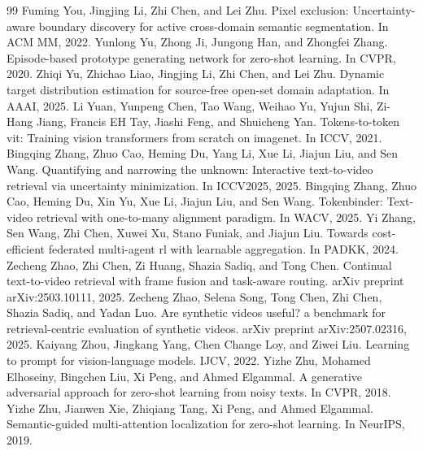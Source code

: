 \begin{thebibliography}{99}
 Fuming You, Jingjing Li, Zhi Chen, and Lei Zhu. Pixel exclusion: Uncertainty-aware boundary discovery for active cross-domain semantic segmentation. In ACM MM, 2022.
 Yunlong Yu, Zhong Ji, Jungong Han, and Zhongfei Zhang. Episode-based prototype generating network for zero-shot learning. In CVPR, 2020.
 Zhiqi Yu, Zhichao Liao, Jingjing Li, Zhi Chen, and Lei Zhu. Dynamic target distribution estimation for source-free open-set domain adaptation. In AAAI, 2025.
 Li Yuan, Yunpeng Chen, Tao Wang, Weihao Yu, Yujun Shi, Zi-Hang Jiang, Francis EH Tay, Jiashi Feng, and Shuicheng Yan. Tokens-to-token vit: Training vision transformers from scratch on imagenet. In ICCV, 2021.
 Bingqing Zhang, Zhuo Cao, Heming Du, Yang Li, Xue Li, Jiajun Liu, and Sen Wang. Quantifying and narrowing the unknown: Interactive text-to-video retrieval via uncertainty minimization. In ICCV2025, 2025.
 Bingqing Zhang, Zhuo Cao, Heming Du, Xin Yu, Xue Li, Jiajun Liu, and Sen Wang. Tokenbinder: Text-video retrieval with one-to-many alignment paradigm. In WACV, 2025.
 Yi Zhang, Sen Wang, Zhi Chen, Xuwei Xu, Stano Funiak, and Jiajun Liu. Towards cost-efficient federated multi-agent rl with learnable aggregation. In PADKK, 2024.
 Zecheng Zhao, Zhi Chen, Zi Huang, Shazia Sadiq, and Tong Chen. Continual text-to-video retrieval with frame fusion and task-aware routing. arXiv preprint arXiv:2503.10111, 2025.
 Zecheng Zhao, Selena Song, Tong Chen, Zhi Chen, Shazia Sadiq, and Yadan Luo. Are synthetic videos useful? a benchmark for retrieval-centric evaluation of synthetic videos. arXiv preprint arXiv:2507.02316, 2025.
 Kaiyang Zhou, Jingkang Yang, Chen Change Loy, and Ziwei Liu. Learning to prompt for vision-language models. IJCV, 2022.
 Yizhe Zhu, Mohamed Elhoseiny, Bingchen Liu, Xi Peng, and Ahmed Elgammal. A generative adversarial approach for zero-shot learning from noisy texts. In CVPR, 2018.
 Yizhe Zhu, Jianwen Xie, Zhiqiang Tang, Xi Peng, and Ahmed Elgammal. Semantic-guided multi-attention localization for zero-shot learning. In NeurIPS, 2019.
\end{thebibliography}

